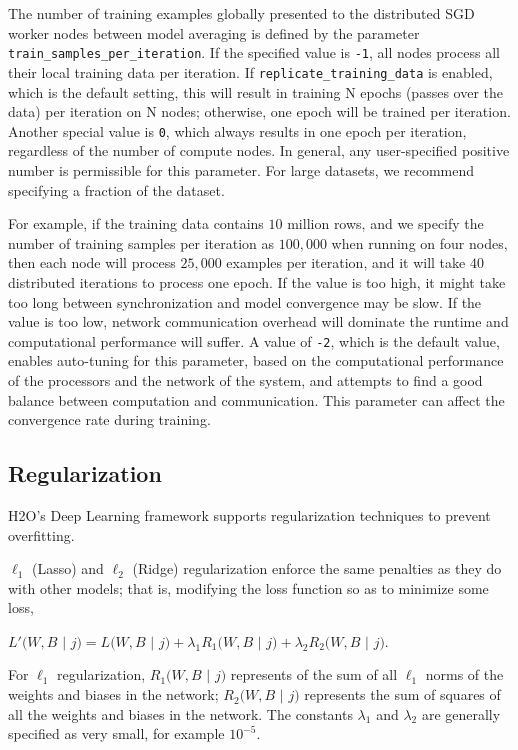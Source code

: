 The number of training examples globally presented to the distributed SGD worker nodes between model averaging is defined by the parameter \texttt{train\_samples\_per\_iteration}. If the specified value is \texttt{-1}, all nodes process all their local training data per iteration. If \texttt{replicate\_training\_data} is enabled, which is the default setting, this will result in training N epochs (passes over the data) per iteration on N nodes; otherwise, one epoch will be trained per iteration. Another special value is \texttt{0}, which always results in one epoch per iteration, regardless of the number of compute nodes. In general, any user-specified positive number is permissible for this parameter. For large datasets, we recommend specifying a fraction of the dataset. 

For example, if the training data contains $10$ million rows, and we specify the number of training samples per iteration as $100,000$ when running on four nodes, then each node will process $25,000$ examples per iteration, and it will take $40$ distributed iterations to process one epoch. If the value is too high, it might take too long between synchronization and model convergence may be slow.  If the value is too low, network communication overhead will dominate the runtime and computational performance will suffer. A value of \texttt{-2}, which is the default value, enables auto-tuning for this parameter, based on the computational performance of the processors and the network of the system, and attempts to find a good balance between computation and communication. This parameter can affect the convergence rate during training.

\noindent
\subsection{Regularization} 
\label{ssec:Regularization}
H2O's Deep Learning framework supports regularization techniques to prevent overfitting. 

$\ell_1$ (Lasso) and $\ell_2$ (Ridge) regularization enforce the same penalties as they do with other models; that is, modifying the loss function so as to minimize some loss, %
\medskip
\begin{center}
$L'(W,B$ $|$ $j) = L(W,B$ $|$ $j) + \lambda_1 R_1(W,B$ $|$ $j) + \lambda_2 R_2(W,B$ $|$ $j)$.
\end{center}
\medskip
For $\ell_1$ regularization, $R_1(W,B$ $|$ $j)$ represents of the sum of all $\ell_1$ norms of the weights and biases in the network; $R_2(W,B$ $|$ $j)$ represents the sum of squares of all the weights and biases in the network. The constants $\lambda_1$ and $\lambda_2$ are generally specified as very small, for example $10^{-5}$.

